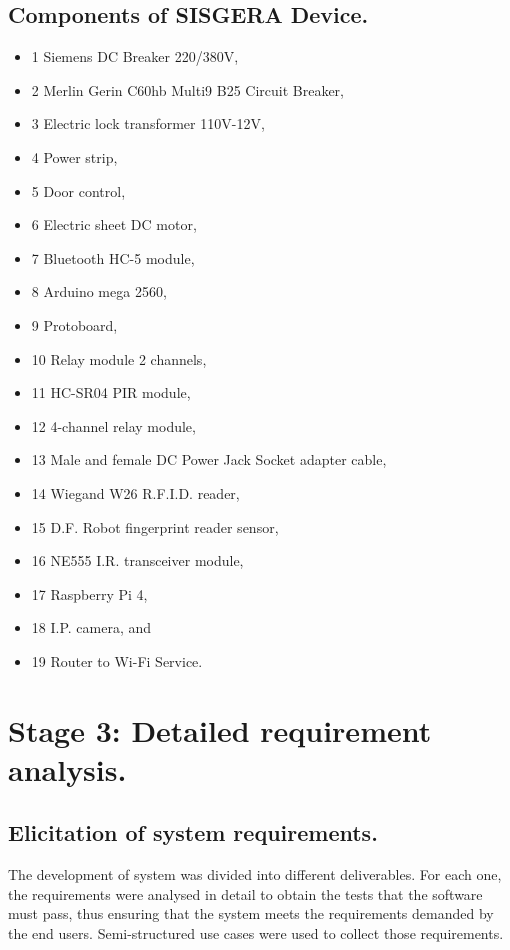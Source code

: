 \documentclass[]{scrartcl}
\begin{document}
	\subsection*{Components of SISGERA Device.}
	\begin{multicols}{2}
		\begin{itemize}
			\item 1 Siemens DC Breaker 220/380V,
			\item 2 Merlin Gerin C60hb Multi9 B25 Circuit Breaker,
			\item 3 Electric lock transformer 110V-12V,
			\item 4 Power strip,
			\item 5 Door control,
			\item 6 Electric sheet DC motor,
			\item 7 Bluetooth HC-5 module,
			\item 8 Arduino mega 2560,
			\item 9 Protoboard,
			\item 10 Relay module 2 channels,
			\item 11 HC-SR04 PIR module,
			\item 12 4-channel relay module,
			\item 13 Male and female DC Power Jack Socket adapter cable,
			\item 14 Wiegand W26 R.F.I.D. reader,
			\item 15 D.F. Robot fingerprint reader sensor,
			\item 16 NE555 I.R. transceiver module,
			\item 17 Raspberry Pi 4,
			\item 18 I.P. camera, and
			\item 19 Router to Wi-Fi Service.
		\end{itemize}
	\end{multicols}
\section*{Stage 3: Detailed requirement analysis.}
	\subsection*{Elicitation of system requirements.}
	The development of system was divided into different deliverables. For each one, the requirements were analysed in detail to obtain the tests that the software must pass, thus ensuring that the system meets the requirements demanded by the end users. Semi-structured use cases were used to collect those requirements.
	
\end{document}
